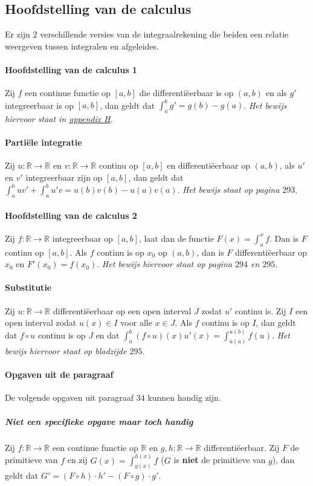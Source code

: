 \subsection{Hoofdstelling van de calculus}
Er zijn $2$ verschillende versies van de integraalrekening die beiden een relatie weergeven tussen integralen en afgeleides.

\paragraph{Hoofdstelling van de calculus 1} Zij $f$ een continue functie op $[a,b]$ die differentiëerbaar is op $(a,b)$ en als $g'$ integreerbaar is op $[a,b]$, dan geldt dat $\int_{a}^{b}g'=g(b)-g(a)$. \textit{Het bewijs hiervoor staat in \hyperref[sec:AH]{appendix H}}.

\paragraph{Partiële integratie} Zij $u:\mathbb{R}\to\mathbb{R}$ en $v:\mathbb{R}\to\mathbb{R}$ continu op $[a,b]$ en differentiëerbaar op $(a,b)$, als $u'$ en $v'$ integreerbaar zijn op $[a,b]$, dan geldt dat $\int_{a}^{b}uv'+\int_{a}^{b}u'v=u(b)v(b)-u(a)v(a)$. \textit{Het bewijs staat op pagina $293$}.

\paragraph{Hoofdstelling van de calculus 2} Zij $f:\mathbb{R}\to\mathbb{R}$ integreerbaar op $[a,b]$, laat dan de functie $F(x)=\int_{a}^{x}f$. Dan is $F$ continu op $[a,b]$. Als $f$ continu is op $x_{0}$ op $(a,b)$, dan is $F$ differentiëerbaar op $x_{0}$ en $F'(x_{0})=f(x_{0})$. \textit{Het bewijs hiervoor staat op pagina $294$ en $295$}.

\paragraph{Substitutie} Zij $u:\mathbb{R}\to\mathbb{R}$ differentiëerbaar op een open interval $J$ zodat $u'$ continu is. Zij $I$ een open interval zodat $u(x)\in I$ voor alle $x\in J$. Als $f$ continu is op $I$, dan geldt dat $f\circ u$ continu is op $J$ en dat $\int_{a}^{b}(f\circ u)(x)u'(x)=\int_{u(a)}^{u(b)}f(u)$. \textit{Het bewijs hiervoor staat op bladzijde $295$}.

\paragraph{Opgaven uit de paragraaf} De volgende opgaven uit paragraaf $34$ kunnen handig zijn.

\subparagraph{Niet een specifieke opgave maar toch handig} Zij $f:\mathbb{R}\to\mathbb{R}$ een continue functie op $\mathbb{R}$ en $g,h:\mathbb{R}\to\mathbb{R}$ differentiëerbaar. Zij $F$ de primitieve van $f$ en zij $G(x)=\int_{g(x)}^{h(x)}f$ ($G$ is \textbf{niet} de primitieve van $g$), dan geldt dat $G'=(F\circ h)\cdot h' - (F\circ g)\cdot g'$.
